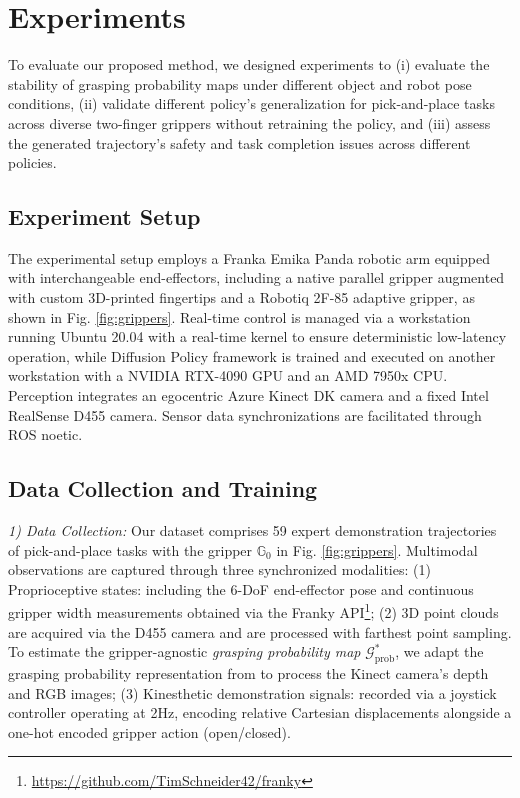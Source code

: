 \section{Experiments} 
To evaluate our proposed method, we designed experiments to (i) evaluate the stability of grasping probability maps under different object and robot pose conditions, (ii) validate different policy's generalization for pick-and-place tasks across diverse two-finger grippers without retraining the policy, and (iii) assess the generated trajectory's safety and task completion issues across different policies.


\subsection{Experiment Setup}
The experimental setup employs a Franka Emika Panda robotic arm equipped with interchangeable end-effectors, including a native parallel gripper augmented with custom 3D-printed fingertips and a Robotiq 2F-85 adaptive gripper, as shown in Fig. \ref{fig:grippers}. Real-time control is managed via a workstation running Ubuntu 20.04 with a real-time kernel to ensure deterministic low-latency operation, while Diffusion Policy framework is trained and executed on another workstation with a NVIDIA RTX-4090 GPU and an AMD 7950x CPU. Perception integrates an egocentric Azure Kinect DK camera and a fixed Intel RealSense D455 camera. Sensor data synchronizations are facilitated through ROS noetic. 


\subsection{Data Collection and Training}
\textit{1) Data Collection:} Our dataset comprises 59 expert demonstration trajectories of pick-and-place tasks with the gripper $\mathbb{G}_0$ in Fig. \ref{fig:grippers}. Multimodal observations are captured through three synchronized modalities: (1) Proprioceptive states: including the 6-DoF end-effector pose and continuous gripper width measurements obtained via the Franky API\footnote{\href{https://github.com/TimSchneider42/franky}{https://github.com/TimSchneider42/franky}}; (2) 3D point clouds are acquired via the D455 camera and are processed with farthest point sampling. To estimate the gripper-agnostic \textit{grasping probability map} $\mathcal{G}^*_{\text{prob}}$, we adapt the grasping probability representation from \cite{10582538} to process the Kinect camera's depth and RGB images; (3) Kinesthetic demonstration signals: recorded via a joystick controller operating at 2Hz, encoding relative Cartesian displacements alongside a one-hot encoded gripper action (open/closed).

